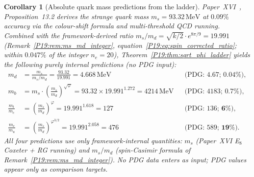 \documentclass[11pt,a4paper]{article}
\newtheorem{corollary}[theorem]{Corollary}
\theoremstyle{definition}\newtheorem{definition}[theorem]{Definition}
\theoremstyle{remark}
\newcommand{\vp}{\varphi}
\begin{document}
\begin{corollary}[Absolute quark mass predictions from the ladder]
\label{P19:cor:absolute_masses}
Paper~XVI~\cite{Paper16}, Proposition~13.2 %
derives the strange quark mass $m_s=93.32\,\mathrm{MeV}$ at $0.09\%$
accuracy via the colour-shift formula and multi-threshold QCD running.
Combined with the framework-derived ratio
$m_s/m_d=\sqrt{k/2}\cdot e^{8\pi/9}=19.991$
(Remark~\ref{P19:rem:ms_md_integer}, equation~\eqref{P19:eq:spin_corrected_ratio};
within $0.047\%$ of the integer $n_e=20$),
Theorem~\ref{P19:thm:sqrt_phi_ladder}
yields the following purely internal predictions (no PDG input):
\begin{align}
  m_d &= \frac{m_s}{m_s/m_d}
       = \frac{93.32}{19.991}
       = 4.668\,\mathrm{MeV}
       &&\text{(PDG: }4.67\text{; }\mathbf{0.04\%}), \label{P19:eq:md_pred}\\[3pt]
  m_b &= m_s\cdot\!\left(\frac{m_s}{m_d}\right)^{\!\!\sqrt{\vp}}
       = 93.32\times 19.991^{1.272}
       = 4214\,\mathrm{MeV}
       &&\text{(PDG: }4183\text{; }\mathbf{0.7\%}), \label{P19:eq:mb_pred}\\[3pt]
  \frac{m_t}{m_c} &= \left(\frac{m_s}{m_d}\right)^{\!\vp}
       = 19.991^{1.618} = 127
       &&\text{(PDG: }136\text{; }\mathbf{6\%}), \label{P19:eq:tc_ratio_pred}\\[3pt]
  \frac{m_c}{m_u} &= \left(\frac{m_s}{m_d}\right)^{\!\vp^{3/2}}
       = 19.991^{2.058} = 476
       &&\text{(PDG: }589\text{; }\mathbf{19\%}). \label{P19:eq:cu_ratio_pred}
\end{align}
All four predictions use only framework-internal quantities:
$m_s$ (Paper~XVI E$_8$ Coxeter + RG running) and $m_s/m_d$ (spin-Casimir
formula of Remark~\ref{P19:rem:ms_md_integer}).  No PDG data
enters as input; PDG values appear only as comparison targets.
\end{corollary}
\end{document}
